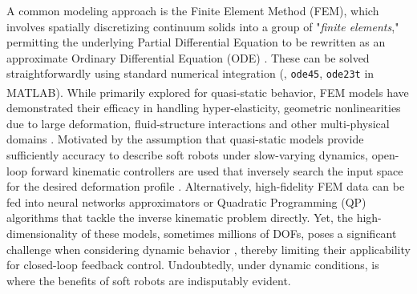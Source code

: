 A common modeling approach is the Finite Element Method (FEM), which involves spatially discretizing continuum solids into a group of "\textit{finite elements}," permitting the underlying Partial Differential Equation to be rewritten as an approximate Ordinary Differential Equation (ODE) \cite{Holzapfel2002,Kim2018}. These can be solved straightforwardly using standard numerical integration (\eg, \texttt{ode45}, \texttt{ode23t} in MATLAB\textsuperscript{\scriptsize\textregistered}).
%
While primarily explored for quasi-static behavior, FEM models have demonstrated their efficacy in handling hyper-elasticity, geometric nonlinearities due to large deformation, fluid-structure interactions and other multi-physical domains \cite{Xavier2022Jun,Hughes2016Nov,Smith2022_FEM,Moerman2018,Maas2012}. Motivated by the assumption that quasi-static models provide sufficiently accuracy to describe soft robots under slow-varying dynamics, open-loop forward kinematic controllers are used that inversely search the input space for the desired deformation profile \cite{Marchese2015,Bern2019,Marchese2016}. Alternatively, high-fidelity FEM data can be fed into neural networks approximators \cite{Fang2022Jun,Zheng2020May} or Quadratic Programming (QP) algorithms \cite{Bern2019} that tackle the inverse kinematic problem directly. Yet, the high-dimensionality of these models, sometimes millions of DOFs, poses a significant challenge when considering dynamic behavior \cite{Goury2018,Duriez2013}, thereby limiting their applicability for closed-loop feedback control. Undoubtedly, under dynamic conditions, is where the benefits of soft robots are indisputably evident.

